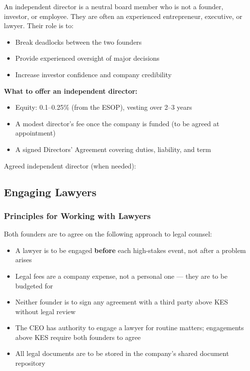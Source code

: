 \documentclass[12pt,a4paper]{article}
\newcommand{\blank}[1][5.5cm]{\underline{\hspace{#1}}}
\begin{document}
An independent director is a neutral board member who is not a founder, investor, or employee. They are often an experienced entrepreneur, executive, or lawyer. Their role is to:

\begin{itemize}
  \item Break deadlocks between the two founders
  \item Provide experienced oversight of major decisions
  \item Increase investor confidence and company credibility
\end{itemize}

\noindent\textbf{What to offer an independent director:}
\begin{itemize}
  \item Equity: 0.1--0.25\% (from the ESOP), vesting over 2--3 years
  \item A modest director's fee once the company is funded (to be agreed at appointment)
  \item A signed Directors' Agreement covering duties, liability, and term
\end{itemize}

\noindent Agreed independent director (when needed): \blank[7cm]

\subsection{Engaging Lawyers}

\subsubsection{Principles for Working with Lawyers}

Both founders are to agree on the following approach to legal counsel:

\begin{itemize}
  \item A lawyer is to be engaged \textbf{before} each high-stakes event, not after a problem arises
  \item Legal fees are a company expense, not a personal one --- they are to be budgeted for
  \item Neither founder is to sign any agreement with a third party above KES \blank[3cm] without legal review
  \item The CEO has authority to engage a lawyer for routine matters; engagements above KES \blank[3cm] require both founders to agree
  \item All legal documents are to be stored in the company's shared document repository
\end{itemize}
\end{document}
